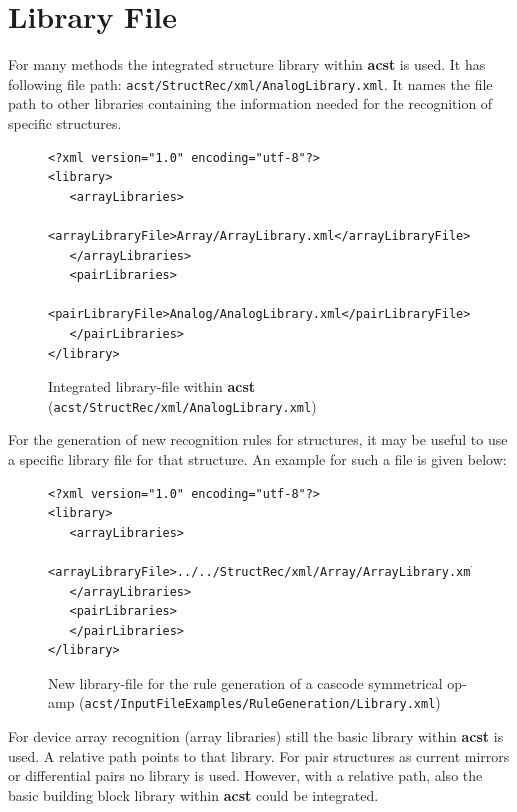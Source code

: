 \section{Library File}\label{sec:inputFileLibraryFile}

For many methods the integrated structure library within {\bf acst} is used. It has following file path: {\tt acst/StructRec/xml/AnalogLibrary.xml}.
It names the file path to other libraries containing the information needed for the recognition of specific structures.

\begin{figure}[H]
	\begin{lstlisting}[basicstyle=\ttfamily\scriptsize,backgroundcolor={\color{gray!30}}, escapechar=? ]
<?xml version="1.0" encoding="utf-8"?>
<library>
   <arrayLibraries>
      <arrayLibraryFile>Array/ArrayLibrary.xml</arrayLibraryFile>
   </arrayLibraries>
   <pairLibraries>
      <pairLibraryFile>Analog/AnalogLibrary.xml</pairLibraryFile>
   </pairLibraries>
</library>
	\end{lstlisting}
	\caption{Integrated library-file within {\bf acst} ({\tt acst/StructRec/xml/AnalogLibrary.xml})}
\end{figure}

For the generation of new recognition rules for structures, it may be useful to use a specific library file for that structure. An example for such a file is given below:


\begin{figure}[H]
	\begin{lstlisting}[basicstyle=\ttfamily\scriptsize,backgroundcolor={\color{gray!30}}, escapechar=? ]
<?xml version="1.0" encoding="utf-8"?>
<library>
   <arrayLibraries>
       <arrayLibraryFile>../../StructRec/xml/Array/ArrayLibrary.xml</arrayLibraryFile>
   </arrayLibraries>
   <pairLibraries>   
   </pairLibraries>
</library>
	\end{lstlisting}
	\caption{New library-file for the rule generation of a cascode symmetrical op-amp ({\tt acst/InputFileExamples/RuleGeneration/Library.xml})}
\end{figure}

For device array recognition (array libraries) still the basic library within {\bf acst} is used. A relative path points to that library. For pair structures as current mirrors or differential pairs no library is used. However, with a relative path, also the basic building block library within {\bf acst} could be integrated. 


